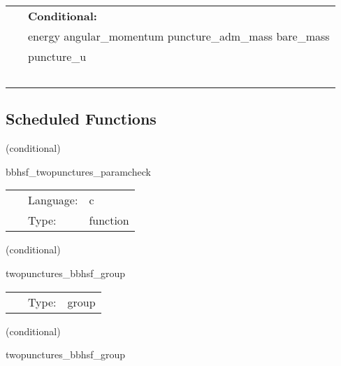  \begin{tabular*}{160mm}{ll} 
~& {\bf Conditional:} \\ 
~ &  energy angular\_momentum puncture\_adm\_mass bare\_mass\\ 
~ &  puncture\_u\\ 
~ & ~\\ 
\end{tabular*} 


\subsection*{Scheduled Functions}
\vspace{5mm}

   (conditional) 

\hspace{5mm} bbhsf\_twopunctures\_paramcheck 

\hspace{5mm}{\it check parameters and thorn needs } 


\hspace{5mm}

 \begin{tabular*}{160mm}{cll} 
~ & Language:  & c \\ 
~ & Type:  & function \\ 
\end{tabular*} 


\vspace{5mm}

   (conditional) 

\hspace{5mm} twopunctures\_bbhsf\_group 

\hspace{5mm}{\it twopunctures initial data group } 


\hspace{5mm}

 \begin{tabular*}{160mm}{cll} 
~ & Type:  & group \\ 
\end{tabular*} 


\vspace{5mm}

   (conditional) 

\hspace{5mm} twopunctures\_bbhsf\_group 

\hspace{5mm}{\it twopunctures initial data group } 


